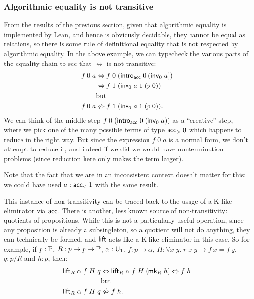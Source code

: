 \subsubsection{Algorithmic equality is not transitive}
From the results of the previous section, given that algorithmic equality is implemented by Lean, and hence is obviously decidable, they cannot be equal as relations, so there is some rule of definitional equality that is not respected by algorithmic equality. In the above example, we can typecheck the various parts of the equality chain to see that $\Leftrightarrow$ is not transitive:
\begin{align*}
f\;0\;a&\Leftrightarrow f\;0\;(\intro_\acc\;0\;(\mathsf{inv}_0\;a))\\
&\Leftrightarrow f\;1\;(\mathsf{inv}_0\;a\;1\;(p\;0))\\
&\mbox{but}\\
f\;0\;a&\not\Leftrightarrow f\;1\;(\mathsf{inv}_0\;a\;1\;(p\;0)).
\end{align*}
We can think of the middle step $f\;0\;(\intro_\acc\;0\;(\mathsf{inv}_0\;a))$ as a ``creative'' step, where we pick one of the many possible terms of type $\acc_{>}\;0$ which happens to reduce in the right way. But since the expression $f\;0\;a$ is a normal form, we don't attempt to reduce it, and indeed if we did we would have nontermination problems (since reduction here only makes the term larger).

Note that the fact that we are in an inconsistent context doesn't matter for this: we could have used $a:\acc_{<}\;1$ with the same result.

This instance of non-transitivity can be traced back to the usage of a K-like eliminator via $\acc$. There is another, less known source of non-transitivity: quotients of propositions. While this is not a particularly useful operation, since any proposition is already a subsingleton, so a quotient will not do anything, they can technically be formed, and $\lift$ acts like a K-like eliminator in this case. So for example, if $p:\P$, $R:p\to p\to\P$, $\alpha:\U_1$, $f:p\to\alpha$, $H:\forall x\;y.\;r\;x\;y\to f\;x= f\;y$, $q:p/R$ and $h:p$, then:
\begin{align*}
\lift_R\;\alpha\;f\;H\;q&\Leftrightarrow \lift_R\;\alpha\;f\;H\;(\mk_R\;h)\Leftrightarrow f\;h\\
&\mbox{but}\\
\lift_R\;\alpha\;f\;H\;q&\not\Leftrightarrow f\;h.
\end{align*}

